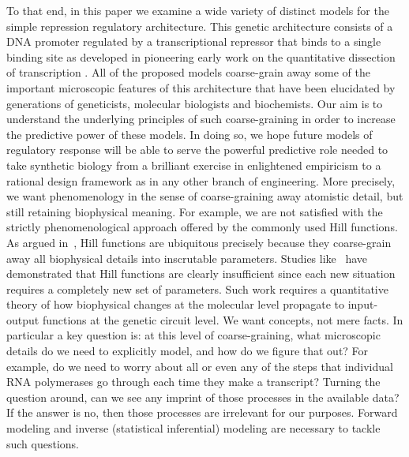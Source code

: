 To that end, in this paper we examine a wide variety of distinct models for the
simple repression regulatory architecture. This genetic architecture consists of
a DNA promoter regulated by a transcriptional repressor that binds to a single
binding site as developed in pioneering early work on the quantitative
dissection of transcription \cite{Oehler1994, Oehler1990}. All of the proposed
models coarse-grain away some of the important microscopic features of
this architecture that have been elucidated by generations of geneticists,
molecular biologists and biochemists. Our aim is to understand the underlying
principles of such coarse-graining in order to increase the predictive power of
these models. In doing so, we hope future models of regulatory response will be
able to serve the powerful predictive role needed to take synthetic biology from
a brilliant exercise in enlightened empiricism to a rational design framework as
in any other branch of engineering. More precisely, we want phenomenology in the
sense of coarse-graining away atomistic detail, but still retaining biophysical
meaning. For example, we are not satisfied with the strictly phenomenological
approach offered by the commonly used Hill functions. As argued
in~\cite{Frank2013}, Hill functions are ubiquitous precisely because they
coarse-grain away all biophysical details into inscrutable parameters. Studies
like~\cite{Razo-Mejia2018} have demonstrated that Hill functions are clearly
insufficient since each new situation requires a completely new set of
parameters. Such work requires a quantitative theory of how biophysical changes
at the molecular level propagate to input-output functions at the genetic
circuit level. We want concepts, not mere facts. In particular a key question
is: at this level of coarse-graining, what microscopic details do we need to
explicitly model, and how do we figure that out? For example, do we need to
worry about all or even any of the steps that individual RNA polymerases go
through each time they make a transcript? Turning the question around, can we
see any imprint of those processes in the available data? If the answer is no,
then those processes are irrelevant for our purposes. Forward modeling and
inverse (statistical inferential) modeling are necessary to tackle such
questions.


